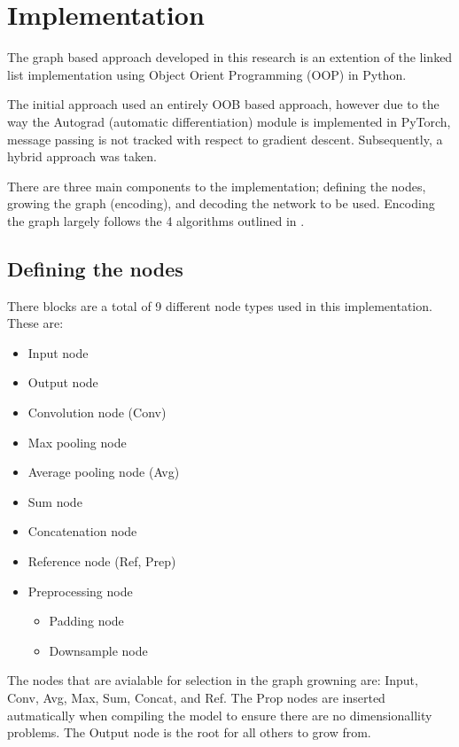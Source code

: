 \section{Implementation}
    \label{sec:impl}

The graph based approach developed in this research is an extention of the linked list implementation using Object Orient Programming (OOP) in Python.

The initial approach used an entirely OOB based approach, however due to the way the Autograd (automatic differentiation) module is implemented in PyTorch, message passing is not tracked with respect to gradient descent. Subsequently, a hybrid approach was taken.

There are three main components to the implementation; defining the nodes, growing the graph (encoding), and decoding the network to be used. Encoding the graph largely follows the 4 algorithms outlined in \autocite{Irwin-Harris2019}.




    \subsection{Defining the nodes}

There blocks are a total of 9 different node types used in this implementation. These are:
    \begin{itemize}
        \item Input node
        \item Output node
        \item Convolution node (Conv)
        \item Max pooling node
        \item Average pooling node (Avg)
        \item Sum node
        \item Concatenation node
        \item Reference node (Ref, Prep)
        \item Preprocessing node
            \begin{itemize}
                 \item Padding node
                \item Downsample node
            \end{itemize}
    \end{itemize}

The nodes that are avialable for selection in the graph growning are: Input, Conv, Avg, Max, Sum, Concat, and Ref. The Prop nodes are inserted autmatically when compiling the model to ensure there are no dimensionallity problems. The Output node is the root for all others to grow from.

